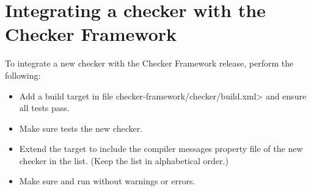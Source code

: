 \section{Integrating a checker with the Checker Framework\label{integrating-a-checker}}


To integrate a new checker with the Checker Framework release, perform
the following:

\begin{itemize}

\item Add a  build target in file
  \<checker-framework/checker/build.xml> and ensure all tests pass.

\item Make sure  tests the new checker.

\item Extend the  target to include the
compiler messages property file of the new checker in
the  list.  (Keep the list in alphabetical order.)

\item Make sure  and  run
without warnings or errors.

\end{itemize}


